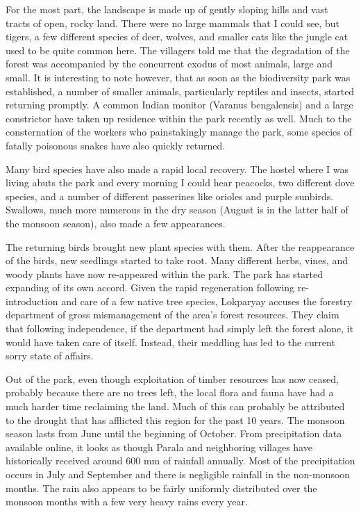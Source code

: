\documentclass{report}
\begin{document}
For the most part, the landscape is made up of gently sloping hills and vast tracts of open, rocky land. There were no large mammals that I could see, but tigers, a few different species of deer, wolves, and smaller cats like the jungle cat used to be quite common here. The villagers told me that the degradation of the forest was accompanied by the concurrent exodus of most animals, large and small. It is interesting to note however, that as soon as the biodiversity park was established, a number of smaller animals, particularly reptiles and insects, started returning promptly. A common Indian monitor (Varanus bengalensis) and a large constrictor have taken up residence within the park recently as well. Much to the consternation of the workers who painstakingly manage the park, some species of fatally poisonous snakes have also quickly returned.

Many bird species have also made a rapid local recovery. The hostel where I was living abuts the park and every morning I could hear peacocks, two different dove species, and a number of different passerines like orioles and purple sunbirds. Swallows, much more numerous in the dry season (August is in the latter half of the monsoon season), also made a few appearances.

The returning birds brought new plant species with them. After the reappearance of the birds, new seedlings started to take root. Many different herbs, vines, and woody plants have now re-appeared within the park. The park has started expanding of its own accord. Given the rapid regeneration following re-introduction and care of a few native tree species, Lokparyay accuses the forestry department of gross mismanagement of the area's forest resources. They claim that following independence, if the department had simply left the forest alone, it would have taken care of itself. Instead, their meddling has led to the current sorry state of affairs.

Out of the park, even though exploitation of timber resources has now ceased, probably because there are no trees left, the local flora and fauna have had a much harder time reclaiming the land. Much of this can probably be attributed to the drought that has afflicted this region for the past 10 years. The monsoon season lasts from June until the beginning of October. From precipitation data available online, it looks as though Parala and neighboring villages have historically received around 600 mm of rainfall annually. Most of the precipitation occurs in July and September and there is negligible rainfall in the non-monsoon months. The rain also appears to be fairly uniformly distributed over the monsoon months with a few very heavy rains every year.
\end{document}
